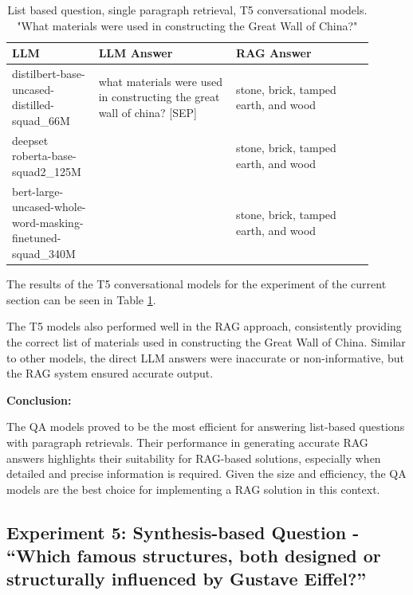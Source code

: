 \documentclass{wseas}
\begin{document}
\begin{table}[htbp]
  \centering
  \label{tab:experiment_R_1_paragraph_Q_listBased_M_T5Models_table}  %
  \caption{List based question, single paragraph retrieval, T5 conversational models. "What materials were used in constructing the Great Wall of China?"}
  \begin{tabular}{|p{0.20\linewidth}|p{0.35\linewidth}|p{0.35\linewidth}|}
    \hline
    \textbf{LLM} & \textbf{LLM Answer} & \textbf{RAG Answer} \\
    \hline
    distilbert-base-uncased-distilled-squad\_66M & what materials were used in constructing the great wall of china? {[}SEP{]} & stone, brick, tamped earth, and wood \\
    \hline
    deepset roberta-base-squad2\_125M & & stone, brick, tamped earth, and wood \\
    \hline
    bert-large-uncased-whole-word-masking-finetuned-squad\_340M & & stone, brick, tamped earth, and wood \\
    \hline
  \end{tabular}
\end{table}

The results of the T5 conversational models for the experiment of the
current section can be seen in Table \ref{tab:experiment_R_1_paragraph_Q_listBased_M_T5Models_table}.

The T5 models also performed well in the RAG approach, consistently
providing the correct list of materials used in constructing the Great
Wall of China. Similar to other models, the direct LLM answers were
inaccurate or non-informative, but the RAG system ensured accurate
output.

\textbf{Conclusion:}

The QA models proved to be the most efficient for answering list-based
questions with paragraph retrievals. Their performance in generating
accurate RAG answers highlights their suitability for RAG-based
solutions, especially when detailed and precise information is required.
Given the size and efficiency, the QA models are the best choice for
implementing a RAG solution in this context.


\subsection{Experiment 5: Synthesis-based Question - ``Which famous
structures, both designed or structurally influenced by Gustave
Eiffel?''}
\end{document}
